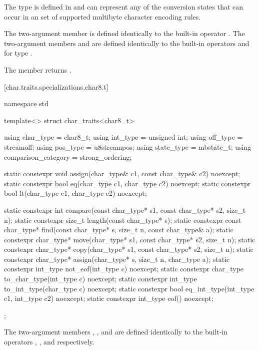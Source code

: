 \pnum
The type  is defined in 
and can represent any of the conversion states that can occur in an
 set of supported multibyte
character encoding rules.

\pnum
The two-argument member  is defined identically to the
built-in operator \tcode{=}. The two-argument members 
and  are defined identically to the built-in operators
\tcode{==} and \tcode{<} for type .

\pnum
The member
returns
.

[char.traits.specializations.char8.t]{}

%
\begin{codeblock}
namespace std {
  template<> struct char_traits<char8_t> {
    using char_type  = char8_t;
    using int_type   = unsigned int;
    using off_type   = streamoff;
    using pos_type   = u8streampos;
    using state_type = mbstate_t;
    using comparison_category = strong_ordering;

    static constexpr void assign(char_type& c1, const char_type& c2) noexcept;
    static constexpr bool eq(char_type c1, char_type c2) noexcept;
    static constexpr bool lt(char_type c1, char_type c2) noexcept;

    static constexpr int compare(const char_type* s1, const char_type* s2, size_t n);
    static constexpr size_t length(const char_type* s);
    static constexpr const char_type* find(const char_type* s, size_t n,
                                           const char_type& a);
    static constexpr char_type* move(char_type* s1, const char_type* s2, size_t n);
    static constexpr char_type* copy(char_type* s1, const char_type* s2, size_t n);
    static constexpr char_type* assign(char_type* s, size_t n, char_type a);
    static constexpr int_type not_eof(int_type c) noexcept;
    static constexpr char_type to_char_type(int_type c) noexcept;
    static constexpr int_type to_int_type(char_type c) noexcept;
    static constexpr bool eq_int_type(int_type c1, int_type c2) noexcept;
    static constexpr int_type eof() noexcept;
  };
}
\end{codeblock}

\pnum
The two-argument members , , and 
are defined identically to
the built-in operators \tcode{=}, \tcode{==}, and \tcode{<} respectively.


